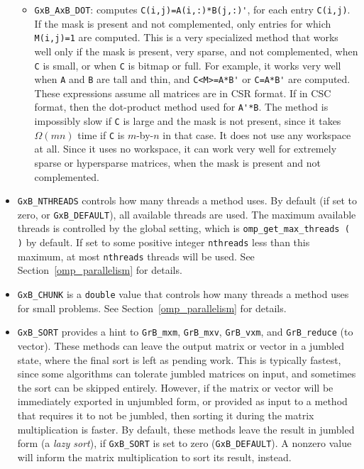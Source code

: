 \documentclass[12pt]{article}
\begin{document}
\begin{itemize}
\begin{itemize}
\item \verb'GxB_AxB_DOT': computes \verb"C(i,j)=A(i,:)*B(j,:)'", for each
    entry \verb'C(i,j)'.  If the mask is present and not complemented, only
    entries for which \verb'M(i,j)=1' are computed.  This is a very specialized
    method that works well only if the mask is present, very sparse, and not
    complemented, when \verb'C' is small, or when \verb'C' is bitmap or full.
    For example, it works very well
    when \verb'A' and \verb'B' are tall and thin, and \verb"C<M>=A*B'" or
    \verb"C=A*B'" are computed.  These expressions assume all matrices are in
    CSR format.  If in CSC format, then the dot-product method used for
    \verb"A'*B".  The method is impossibly slow if \verb'C' is large and the
    mask is not present, since it takes $\Omega(mn)$ time if \verb'C' is
    $m$-by-$n$ in that case.  It does not use any workspace at all.  Since it
    uses no workspace, it can work very well for extremely sparse or
    hypersparse matrices, when the mask is present and not complemented.

    \end{itemize}

\item \verb'GxB_NTHREADS' controls how many threads a method uses.
    By default (if set to zero, or \verb'GxB_DEFAULT'), all available threads
    are used.  The maximum available threads is controlled by the global
    setting, which is \verb'omp_get_max_threads ( )' by default.  If set to
    some positive integer \verb'nthreads' less than this maximum, at most
    \verb'nthreads' threads will be used.  See Section~\ref{omp_parallelism}
    for details.

\item \verb'GxB_CHUNK' is a \verb'double' value that controls how many threads
    a method uses for small problems.  See Section~\ref{omp_parallelism} for
    details.

\item \verb'GxB_SORT' provides a hint to \verb'GrB_mxm', \verb'GrB_mxv',
    \verb'GrB_vxm', and \verb'GrB_reduce' (to vector).  These methods can leave
    the output matrix or vector in a jumbled state, where the final sort is
    left as pending work.  This is typically fastest, since some algorithms can
    tolerate jumbled matrices on input, and sometimes the sort can be skipped
    entirely.  However, if the matrix or vector will be immediately exported in
    unjumbled form, or provided as input to a method that requires it to not be
    jumbled, then sorting it during the matrix multiplication is faster.
    By default, these methods leave the result in jumbled form (a {\em lazy
    sort}), if \verb'GxB_SORT' is set to zero (\verb'GxB_DEFAULT').  A nonzero
    value will inform the matrix multiplication to sort its result, instead.


\end{itemize}
\end{document}
